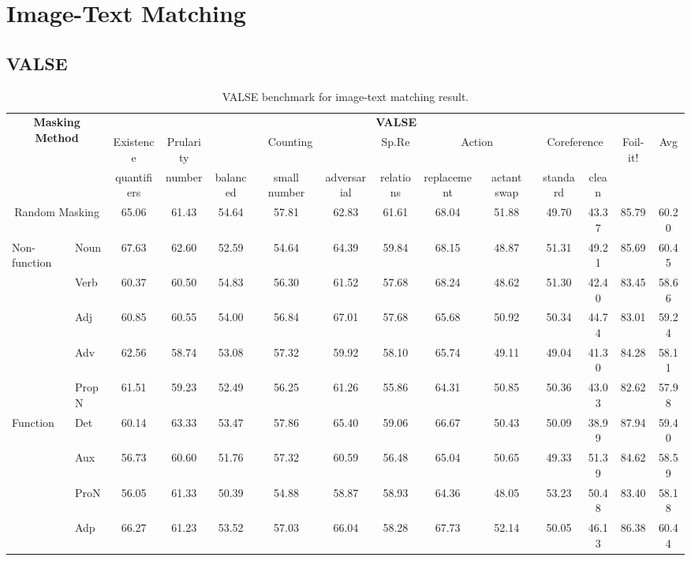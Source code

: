 \section{Image-Text Matching}

\subsection{VALSE}
\begin{table}[]
    \centering
    \label{tab:valse}
    \caption{VALSE benchmark for image-text matching result.}
    \begin{adjustbox}{width=1\textwidth}
        \begin{tabular}{ll|c|c|ccc|c|cc|cc|c|c}
            \hline
            \multicolumn{2}{c|}{\multirow{3}{*}{\textbf{Masking Method}}} & \multicolumn{12}{c}{\textbf{VALSE}} \\
            & & Existence & Prularity & \multicolumn{3}{c|}{Counting} & Sp.Re \footnotemark & \multicolumn{2}{c|}{Action} & \multicolumn{2}{c|}{Coreference} & \multirow{2}{*}{Foil-it!} & \multirow{2}{*}{Avg} \\
            & & quantifiers & number & balanced & small number & adversarial & relations & replacement & actant swap & standard & clean & & \\
            \hline
            \multicolumn{2}{c|}{Random Masking} & 65.06 & 61.43 & 54.64 & 57.81 & 62.83 & 61.61 & 68.04 & 51.88 & 49.70 & 43.37 & 85.79 & 60.20 \\
            \hline
            \multirow{5}{*}{Non-function} & Noun & 67.63 & 62.60 & 52.59 & 54.64 & 64.39 & 59.84 & 68.15 & 48.87 & 51.31 & 49.21 & 85.69 & 60.45 \\
            & Verb & 60.37 & 60.50 & 54.83 & 56.30 & 61.52 & 57.68 & 68.24 & 48.62 & 51.30 & 42.40 & 83.45 & 58.66 \\
            & Adj & 60.85 & 60.55 & 54.00 & 56.84 & 67.01 & 57.68 & 65.68 & 50.92 & 50.34 & 44.74 & 83.01 & 59.24 \\
            & Adv & 62.56 & 58.74 & 53.08 & 57.32 & 59.92 & 58.10 & 65.74 & 49.11 & 49.04 & 41.30 & 84.28 & 58.11 \\
            & PropN & 61.51 & 59.23 & 52.49 & 56.25 & 61.26 & 55.86 & 64.31 & 50.85 & 50.36 & 43.03 & 82.62 & 57.98 \\
            \hline
            \multirow{4}{*}{Function} & Det & 60.14 & 63.33 & 53.47 & 57.86 & 65.40 & 59.06 & 66.67 & 50.43 & 50.09 & 38.99 & 87.94 & 59.40 \\
            & Aux & 56.73 & 60.60 & 51.76 & 57.32 & 60.59 & 56.48 & 65.04 & 50.65 & 49.33 & 51.39 & 84.62 & 58.59 \\
            & ProN & 56.05 & 61.33 & 50.39 & 54.88 & 58.87 & 58.93 & 64.36 & 48.05 & 53.23 & 50.48 & 83.40 & 58.18 \\
            & Adp & 66.27 & 61.23 & 53.52 & 57.03 & 66.04 & 58.28 & 67.73 & 52.14 & 50.05 & 46.13 & 86.38 & 60.44 \\
            \hline
        \end{tabular}
    \end{adjustbox}
\end{table}


